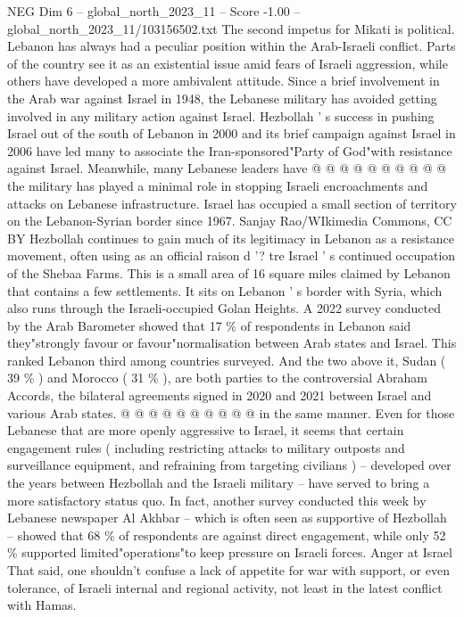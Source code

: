 \begin{textsample}{NEG Dim 6 – global\_north\_2023\_11 – Score -1.00 – global\_north\_2023\_11/103156502.txt}
The second impetus for Mikati is political.
Lebanon has always had a peculiar position within the Arab-Israeli conflict.
Parts of the country see it as an existential issue amid fears of Israeli aggression, while others have developed a more ambivalent attitude.
Since a brief involvement in the Arab war against Israel in 1948, the Lebanese military has avoided getting involved in any military action against Israel.
Hezbollah ' s success in pushing Israel out of the south of Lebanon in 2000 and its brief campaign against Israel in 2006 have led many to associate the Iran-sponsored"Party of God"with resistance against Israel.
Meanwhile, many Lebanese leaders have @ @ @ @ @ @ @ @ @ @ the military has played a minimal role in stopping Israeli encroachments and attacks on Lebanese infrastructure.
Israel has occupied a small section of territory on the Lebanon-Syrian border since 1967.
Sanjay Rao/WIkimedia Commons, CC BY Hezbollah continues to gain much of its legitimacy in Lebanon as a resistance movement, often using as an official raison d '? tre Israel ' s continued occupation of the Shebaa Farms.
This is a small area of 16 square miles claimed by Lebanon that contains a few settlements.
It sits on Lebanon ' s border with Syria, which also runs through the Israeli-occupied Golan Heights.
A 2022 survey conducted by the Arab Barometer showed that 17 \% of respondents in Lebanon said they"strongly favour or favour"normalisation between Arab states and Israel.
This ranked Lebanon third among countries surveyed.
And the two above it, Sudan ( 39 \% ) and Morocco ( 31 \% ), are both parties to the controversial Abraham Accords, the bilateral agreements signed in 2020 and 2021 between Israel and various Arab states. @ @ @ @ @ @ @ @ @ @ in the same manner.
Even for those Lebanese that are more openly aggressive to Israel, it seems that certain engagement rules ( including restricting attacks to military outposts and surveillance equipment, and refraining from targeting civilians ) -- developed over the years between Hezbollah and the Israeli military -- have served to bring a more satisfactory status quo.
In fact, another survey conducted this week by Lebanese newspaper Al Akhbar -- which is often seen as supportive of Hezbollah -- showed that 68 \% of respondents are against direct engagement, while only 52 \% supported limited"operations"to keep pressure on Israeli forces.
Anger at Israel That said, one shouldn't confuse a lack of appetite for war with support, or even tolerance, of Israeli internal and regional activity, not least in the latest conflict with Hamas.

\end{textsample}
